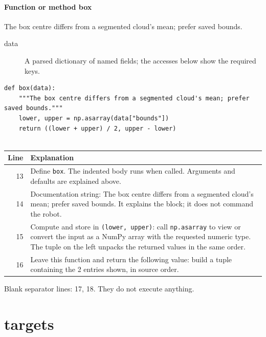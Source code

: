 \documentclass[11pt,a4paper]{book}
\begin{document}
\paragraph{Function or method box}
The box centre differs from a segmented cloud's mean; prefer saved bounds.

\begin{description}
\item[data] A parsed dictionary of named fields; the accesses below show the required keys.
\end{description}

\begin{lstlisting}[firstnumber=13]
def box(data):
    """The box centre differs from a segmented cloud's mean; prefer saved bounds."""
    lower, upper = np.asarray(data["bounds"])
    return ((lower + upper) / 2, upper - lower)


\end{lstlisting}

\begin{longtable}{r p{}}

\textbf{Line} & \textbf{Explanation} \\ \hline \endhead

13 & Define \texttt{box}. The indented body runs when called. Arguments and defaults are explained above. \\

14 & Documentation string: The box centre differs from a segmented cloud's mean; prefer saved bounds. It explains the block; it does not command the robot. \\

15 & Compute and store in \texttt{(lower, upper)}: call \texttt{np.asarray} to view or convert the input as a NumPy array with the requested numeric type. The tuple on the left unpacks the returned values in the same order. \\

16 & Leave this function and return the following value: build a tuple containing the 2 entries shown, in source order. \\

\end{longtable}

Blank separator lines: 17, 18. They do not execute anything.

\section{targets}
\end{document}
